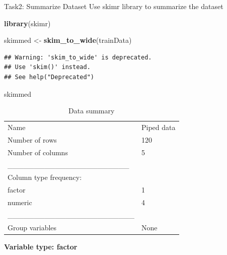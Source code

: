 \documentclass[
]{article}
\newenvironment{Shaded}{\begin{snugshade}}{\end{snugshade}}
\newcommand{\FunctionTok}[1]{\textcolor[rgb]{0.13,0.29,0.53}{\textbf{#1}}}
\newcommand{\NormalTok}[1]{#1}
\newcommand{\OtherTok}[1]{\textcolor[rgb]{0.56,0.35,0.01}{#1}}
\begin{document}
Task2: Summarize Dataset Use skimr library to summarize the dataset

\begin{Shaded}
\begin{Highlighting}[]
\FunctionTok{library}\NormalTok{(skimr)}

\NormalTok{skimmed }\OtherTok{\textless{}{-}} \FunctionTok{skim\_to\_wide}\NormalTok{(trainData)}
\end{Highlighting}
\end{Shaded}

\begin{verbatim}
## Warning: 'skim_to_wide' is deprecated.
## Use 'skim()' instead.
## See help("Deprecated")
\end{verbatim}

\begin{Shaded}
\begin{Highlighting}[]
\NormalTok{skimmed}
\end{Highlighting}
\end{Shaded}

\begin{longtable}[]{@{}ll@{}}
\caption{Data summary}\tabularnewline
\toprule\noalign{}
\endfirsthead
\endhead
\bottomrule\noalign{}
\endlastfoot
Name & Piped data \\
Number of rows & 120 \\
Number of columns & 5 \\
\_\_\_\_\_\_\_\_\_\_\_\_\_\_\_\_\_\_\_\_\_\_\_ & \\
Column type frequency: & \\
factor & 1 \\
numeric & 4 \\
\_\_\_\_\_\_\_\_\_\_\_\_\_\_\_\_\_\_\_\_\_\_\_\_ & \\
Group variables & None \\
\end{longtable}

\textbf{Variable type: factor}
\end{document}
